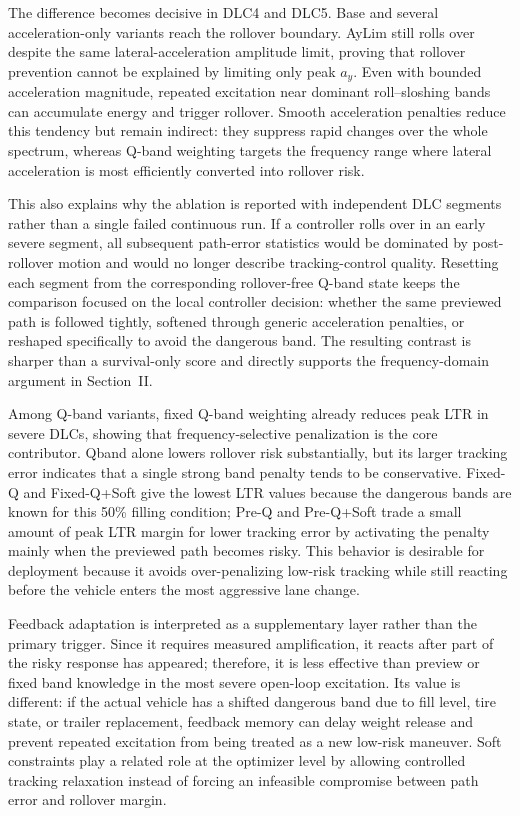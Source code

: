 The difference becomes decisive in DLC4 and DLC5. Base and several acceleration-only variants reach the rollover boundary. AyLim still rolls over despite the same lateral-acceleration amplitude limit, proving that rollover prevention cannot be explained by limiting only peak $a_y$. Even with bounded acceleration magnitude, repeated excitation near dominant roll--sloshing bands can accumulate energy and trigger rollover. Smooth acceleration penalties reduce this tendency but remain indirect: they suppress rapid changes over the whole spectrum, whereas Q-band weighting targets the frequency range where lateral acceleration is most efficiently converted into rollover risk.

This also explains why the ablation is reported with independent DLC segments rather than a single failed continuous run. If a controller rolls over in an early severe segment, all subsequent path-error statistics would be dominated by post-rollover motion and would no longer describe tracking-control quality. Resetting each segment from the corresponding rollover-free Q-band state keeps the comparison focused on the local controller decision: whether the same previewed path is followed tightly, softened through generic acceleration penalties, or reshaped specifically to avoid the dangerous band. The resulting contrast is sharper than a survival-only score and directly supports the frequency-domain argument in Section~II.

Among Q-band variants, fixed Q-band weighting already reduces peak LTR in severe DLCs, showing that frequency-selective penalization is the core contributor. Qband alone lowers rollover risk substantially, but its larger tracking error indicates that a single strong band penalty tends to be conservative. Fixed-Q and Fixed-Q+Soft give the lowest LTR values because the dangerous bands are known for this 50\% filling condition; Pre-Q and Pre-Q+Soft trade a small amount of peak LTR margin for lower tracking error by activating the penalty mainly when the previewed path becomes risky. This behavior is desirable for deployment because it avoids over-penalizing low-risk tracking while still reacting before the vehicle enters the most aggressive lane change.

Feedback adaptation is interpreted as a supplementary layer rather than the primary trigger. Since it requires measured amplification, it reacts after part of the risky response has appeared; therefore, it is less effective than preview or fixed band knowledge in the most severe open-loop excitation. Its value is different: if the actual vehicle has a shifted dangerous band due to fill level, tire state, or trailer replacement, feedback memory can delay weight release and prevent repeated excitation from being treated as a new low-risk maneuver. Soft constraints play a related role at the optimizer level by allowing controlled tracking relaxation instead of forcing an infeasible compromise between path error and rollover margin.

